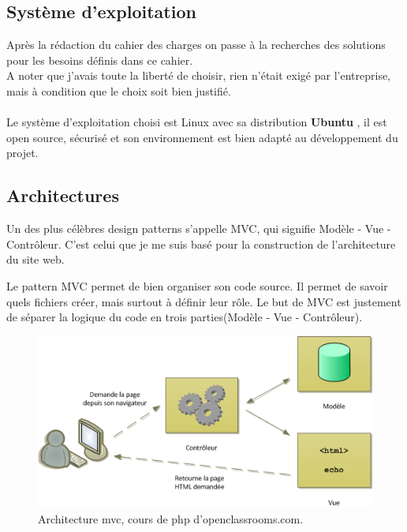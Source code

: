 \documentclass[12pt]{article}
\begin{document}
\subsection{Système d'exploitation}
Après la rédaction du cahier des charges  on passe à la recherches des solutions pour les besoins définis dans ce cahier. \\
A noter que j'avais toute la liberté de choisir, rien n'était exigé par l'entreprise, mais à condition que 
le choix soit bien justifié.\\ \\

Le système d'exploitation choisi est Linux avec sa distribution \textbf{Ubuntu} , il est open source, sécurisé et son environnement est bien adapté au développement du projet. 

\subsection{Architectures}
Un des plus célèbres design patterns s'appelle MVC, qui signifie Modèle - Vue - Contrôleur. C'est celui que je me suis basé pour la construction de l’architecture du site web.

Le pattern MVC permet de bien organiser son code source. Il permet de savoir quels fichiers créer, mais surtout à définir leur rôle. Le but de MVC est justement de séparer la logique du code en trois parties(Modèle - Vue - Contrôleur).\\

\begin{center}
\begin{figure}[htp]
  \centering
  \includegraphics[width=12cm]{mvc.png}
  \caption{Architecture mvc, cours de php d'openclassrooms.com.}
  \label{fig:une-autre-image}
\end{figure}

\end{center}
\end{document}
